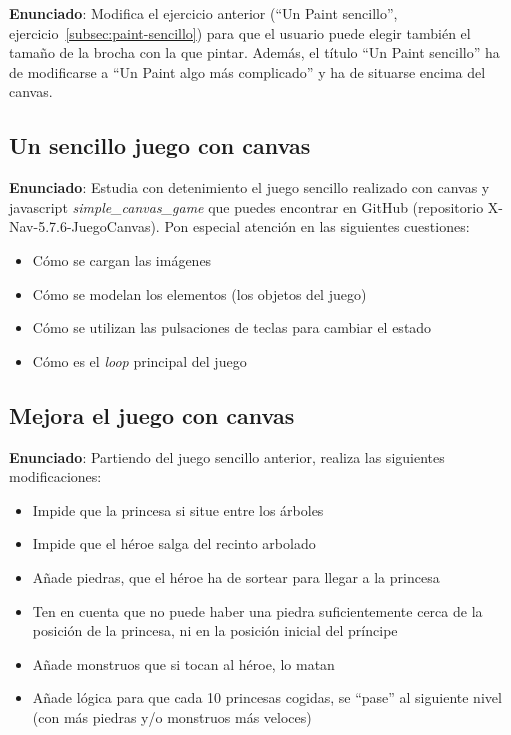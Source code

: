 \textbf{Enunciado}: Modifica el ejercicio anterior (``Un Paint sencillo'', ejercicio~\ref{subsec:paint-sencillo}) para que el usuario puede elegir también el tamaño de la brocha con la que pintar. Además, el título ``Un Paint sencillo'' ha de modificarse a ``Un Paint algo más complicado'' y ha de situarse encima del canvas.

\subsection{Un sencillo juego con canvas}
\label{subsec:estudia-juego}

\textbf{Enunciado}: Estudia con detenimiento el juego sencillo realizado
con canvas y javascript \emph{simple\_canvas\_game} que puedes encontrar en GitHub
(repositorio X-Nav-5.7.6-JuegoCanvas). Pon especial atención en las siguientes cuestiones:

\begin{itemize}
  \item Cómo se cargan las imágenes
  \item Cómo se modelan los elementos (los objetos del juego)
  \item Cómo se utilizan las pulsaciones de teclas para cambiar el estado
  \item Cómo es el \emph{loop} principal del juego
\end{itemize}

\subsection{Mejora el juego con canvas}
\label{subsec:modifica-juego}

\textbf{Enunciado}: Partiendo del juego sencillo anterior, realiza las 
siguientes modificaciones:

\begin{itemize}
  \item Impide que la princesa si situe entre los árboles
  \item Impide que el héroe salga del recinto arbolado
  \item Añade piedras, que el héroe ha de sortear para llegar a la princesa
  \item Ten en cuenta que no puede haber una piedra suficientemente cerca de la posición de la princesa, ni en la posición inicial del príncipe
  \item Añade monstruos que si tocan al héroe, lo matan
  \item Añade lógica para que cada 10 princesas cogidas, se ``pase'' al siguiente
nivel (con más piedras y/o monstruos más veloces)
\end{itemize}

